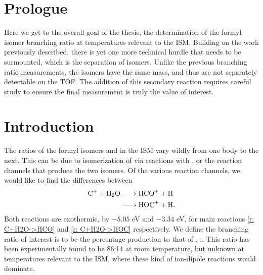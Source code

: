 \section{Prologue}

Here we get to the overall goal of the thesis, the determination of the formyl isomer branching ratio at temperatures relevant to the ISM. Building on the work previously described, there is yet one more technical hurdle that needs to be surmounted, which is the separation of isomers. Unlike the previous branching ratio measurements, the isomers have the same mass, and thus are not separately detectable on the TOF. The addition of this secondary reaction requires careful study to ensure the final measurement is truly the value of interest.

\section{Introduction}

The ratios of the formyl isomers  and  in the ISM vary wildly from one body to the next.\cite{Liszt2004} This can be due to isomerization of  via reactions with , or the reaction channels that produce the two isomers.\cite{Apponi1997} Of the various reaction channels, we would like to find the differences between
\begin{align}
	\ce{C+ + H2O & -> HCO+ + H} \label{r: C+H2O->HCO} \\
	\ce{& -> HOC+ + H}. \label{r: C+H2O->HOC}
\end{align}
Both reactions are exothermic, by $-5.05$ eV and $-3.34$ eV, for main reactions \ref{r: C+H2O->HCO} and \ref{r: C+H2O->HOC} respectively.\cite{Chalk1997} We define the branching ratio of interest is to be the percentage  production to that of , :. This ratio has been experimentally found to be 86:14 at room temperature\cite{Freeman1987}, but unknown at temperatures relevant to the ISM, where these kind of ion-dipole reactions would dominate.

